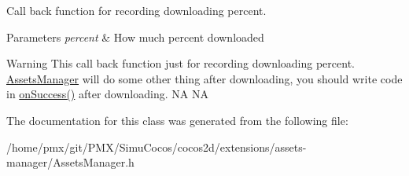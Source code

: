 Call back function for recording downloading percent. 


\begin{DoxyParams}{Parameters}
{\em percent} & How much percent downloaded \\
\hline
\end{DoxyParams}
\begin{DoxyWarning}{Warning}
This call back function just for recording downloading percent. \hyperlink{classAssetsManager}{Assets\+Manager} will do some other thing after downloading, you should write code in \hyperlink{classAssetsManagerDelegateProtocol_a3a6c17217d8bf0437f411748e610acd9}{on\+Success()} after downloading.  NA  NA 
\end{DoxyWarning}


The documentation for this class was generated from the following file\+:\begin{DoxyCompactItemize}
\item 
/home/pmx/git/\+P\+M\+X/\+Simu\+Cocos/cocos2d/extensions/assets-\/manager/Assets\+Manager.\+h\end{DoxyCompactItemize}

